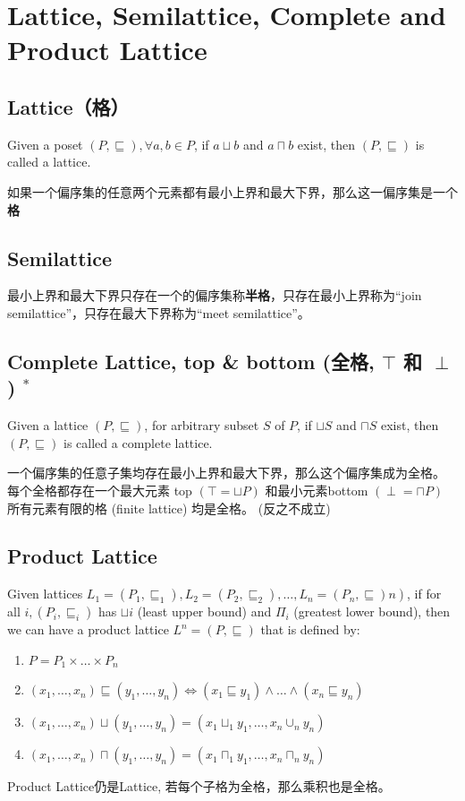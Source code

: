 \documentclass[a4paper]{article}
\theoremstyle{definition}
\begin{document}
\section{Lattice, Semilattice, Complete and Product Lattice}
\subsection{Lattice（格）}
Given a poset $(P, \sqsubseteq), \forall a, b \in P$, if $a \sqcup b$ and $a \sqcap b$ exist, then $(P, \sqsubseteq)$ is called a lattice.

如果一个偏序集的任意两个元素都有最小上界和最大下界，那么这一偏序集是一个\textbf{格}

\subsection{Semilattice}
最小上界和最大下界只存在一个的偏序集称\textbf{半格}，只存在最小上界称为“join semilattice”，只存在最大下界称为“meet semilattice”。

\subsection{Complete Lattice, top \& bottom (全格, $\top$ 和 $\perp$ ) $^{*}$}
Given a lattice $(P, \sqsubseteq)$, for arbitrary subset $S$ of $P$, if $\sqcup S$ and $\sqcap S$ exist, then $(P, \sqsubseteq)$ is
called a complete lattice.

一个偏序集的任意子集均存在最小上界和最大下界，那么这个偏序集成为全格。
每个全格都存在一个最大元素 top $(\top=\sqcup P)$ 和最小元素bottom $(\perp=\sqcap P)$
所有元素有限的格 (finite lattice) 均是全格。 (反之不成立)
\subsection{Product Lattice}
Given lattices $\left.L_{1}=\left(P_{1}, \sqsubseteq_{1}\right), L_{2}=\left(P_{2}, \sqsubseteq_{2}\right), \ldots, L_{n}=\left(P_{n}, \sqsubseteq\right) n\right)$, if for all $i,\left(P_{i}, \sqsubseteq_{i}\right)$
has $\sqcup i$ (least upper bound) and $\Pi_{i}$ (greatest lower bound), then we can have a product
lattice $L^{n}=(P, \sqsubseteq)$ that is defined by:
\begin{enumerate}
\item $P=P_{1} \times \ldots \times P_{n}$
\item $\left(x_{1}, \ldots, x_{n}\right) \sqsubseteq\left(y_{1}, \ldots, y_{n}\right) \Leftrightarrow\left(x_{1} \sqsubseteq y_{1}\right) \wedge \ldots \wedge\left(x_{n} \sqsubseteq y_{n}\right)$
\item $\left(x_{1}, \ldots, x_{n}\right) \sqcup\left(y_{1}, \ldots, y_{n}\right)=\left(x_{1} \sqcup_{1} y_{1}, \ldots, x_{n} \cup_{n} y_{n}\right)$
\item  $\left(x_{1}, \ldots, x_{n}\right) \sqcap\left(y_{1}, \ldots, y_{n}\right)=\left(x_{1} \sqcap_{1} y_{1}, \ldots, x_{n} \sqcap_{n} y_{n}\right)$
\end{enumerate}
Product Lattice仍是Lattice, 若每个子格为全格，那么乘积也是全格。
\end{document}
